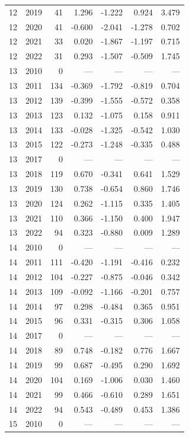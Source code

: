 \begin{longtable}{llrrrrr}
12 & 2019 & 41 & 1.296 & -1.222 & 0.924 & 3.479 \\
12 & 2020 & 41 & -0.600 & -2.041 & -1.278 & 0.702 \\
12 & 2021 & 33 & 0.020 & -1.867 & -1.197 & 0.715 \\
12 & 2022 & 31 & 0.293 & -1.507 & -0.509 & 1.745 \\
13 & 2010 & 0 & --- & --- & --- & --- \\
13 & 2011 & 134 & -0.369 & -1.792 & -0.819 & 0.704 \\
13 & 2012 & 139 & -0.399 & -1.555 & -0.572 & 0.358 \\
13 & 2013 & 123 & 0.132 & -1.075 & 0.158 & 0.911 \\
13 & 2014 & 133 & -0.028 & -1.325 & -0.542 & 1.030 \\
13 & 2015 & 122 & -0.273 & -1.248 & -0.335 & 0.488 \\
13 & 2017 & 0 & --- & --- & --- & --- \\
13 & 2018 & 119 & 0.670 & -0.341 & 0.641 & 1.529 \\
13 & 2019 & 130 & 0.738 & -0.654 & 0.860 & 1.746 \\
13 & 2020 & 124 & 0.262 & -1.115 & 0.335 & 1.405 \\
13 & 2021 & 110 & 0.366 & -1.150 & 0.400 & 1.947 \\
13 & 2022 & 94 & 0.323 & -0.880 & 0.009 & 1.289 \\
14 & 2010 & 0 & --- & --- & --- & --- \\
14 & 2011 & 111 & -0.420 & -1.191 & -0.416 & 0.232 \\
14 & 2012 & 104 & -0.227 & -0.875 & -0.046 & 0.342 \\
14 & 2013 & 109 & -0.092 & -1.166 & -0.201 & 0.757 \\
14 & 2014 & 97 & 0.298 & -0.484 & 0.365 & 0.951 \\
14 & 2015 & 96 & 0.331 & -0.315 & 0.306 & 1.058 \\
14 & 2017 & 0 & --- & --- & --- & --- \\
14 & 2018 & 89 & 0.748 & -0.182 & 0.776 & 1.667 \\
14 & 2019 & 99 & 0.687 & -0.495 & 0.290 & 1.692 \\
14 & 2020 & 104 & 0.169 & -1.006 & 0.030 & 1.460 \\
14 & 2021 & 99 & 0.466 & -0.610 & 0.289 & 1.651 \\
14 & 2022 & 94 & 0.543 & -0.489 & 0.453 & 1.386 \\
15 & 2010 & 0 & --- & --- & --- & --- \\

\end{longtable}
